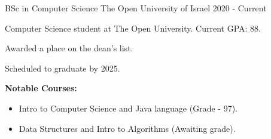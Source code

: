 

\begin{cventries}

  \cventry
    {BSc in Computer Science} %
    {The Open University of Israel} %
    {} %
    {2020 - Current} %
    {
      \begin{cvitems} %
        \item {Computer Science student at The Open University. Current GPA: 88.}
        \item {Awarded a place on the dean’s list.}
        \item {Scheduled to graduate by 2025.}
        \item \textbf{Notable Courses:}
            \vspace{3pt}
            \begin{itemize}
                \setlength\itemsep{3pt}
              \item Intro to Computer Science and Java language (Grade - 97).
              \item Data Structures and Intro to Algorithms (Awaiting grade).
            \end{itemize}
      \end{cvitems}
    }
\end{cventries}
